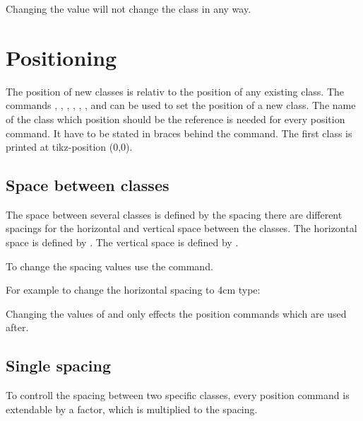 \documentclass[parskip=full]{scrartcl}
\begin{document}
	\begin{attention}
		Changing the  value will not change the class in any way.
	\end{attention}

	\section{Positioning}
	The position of new classes is relativ to the position of any existing class. The commands , , , , , ,  and  can be used to set the position of a new class. The name of the class which position should be the reference is needed for every position command. It have to be stated in braces behind the command. The first class is printed at tikz-position (0,0).
		
	\subsection{Space between classes}
	The space between several classes is defined by the spacing there are different spacings for the horizontal and vertical space between the classes. The horizontal space is defined by . The vertical space is defined by .
	
	To change the spacing values use the  command.
	
	For example to change the horizontal spacing to 4cm type:\\
	\begin{info}
		Changing the values of  and  only effects the position commands which are used after.
	\end{info}

	\subsection{Single spacing}
	To controll the spacing between two specific classes, every position command is extendable by a factor, which is multiplied to the spacing.
	
\end{document}
